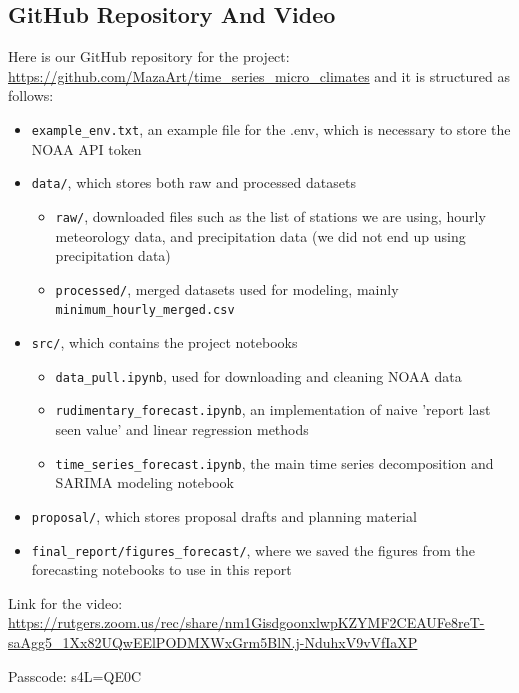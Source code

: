 \documentclass{article}
\begin{document}
\subsection{GitHub Repository And Video}
Here is our GitHub repository for the project: \url{https://github.com/MazaArt/time_series_micro_climates} and it is structured as follows:

\begin{itemize}
    \item \texttt{example\_env.txt}, an example file for the .env, which is necessary to store the NOAA API token 
    \item \texttt{data/}, which stores both raw and processed datasets
    \begin{itemize}
        \item \texttt{raw/}, downloaded files such as the list of stations we are using, hourly meteorology data, and precipitation data (we did not end up using precipitation data)
        \item \texttt{processed/}, merged datasets used for modeling, mainly \texttt{minimum\_hourly\_merged.csv}
    \end{itemize}
    \item \texttt{src/}, which contains the project notebooks
    \begin{itemize}
        \item \texttt{data\_pull.ipynb}, used for downloading and cleaning NOAA data
        \item \texttt{rudimentary\_forecast.ipynb}, an implementation of naive 'report last seen value' and linear regression methods
        \item \texttt{time\_series\_forecast.ipynb}, the main time series decomposition and SARIMA modeling notebook
    \end{itemize}
    \item \texttt{proposal/}, which stores proposal drafts and planning material
    \item \texttt{final\_report/figures\_forecast/}, where we saved the figures from the forecasting notebooks to use in this report
\end{itemize}

Link for the video: \url{https://rutgers.zoom.us/rec/share/nm1GisdgoonxlwpKZYMF2CEAUFe8reT-saAgg5_1Xx82UQwEElPODMXWxGrm5BlN.j-NduhxV9vVfIaXP}

Passcode: s4L=QE0C
\end{document}
